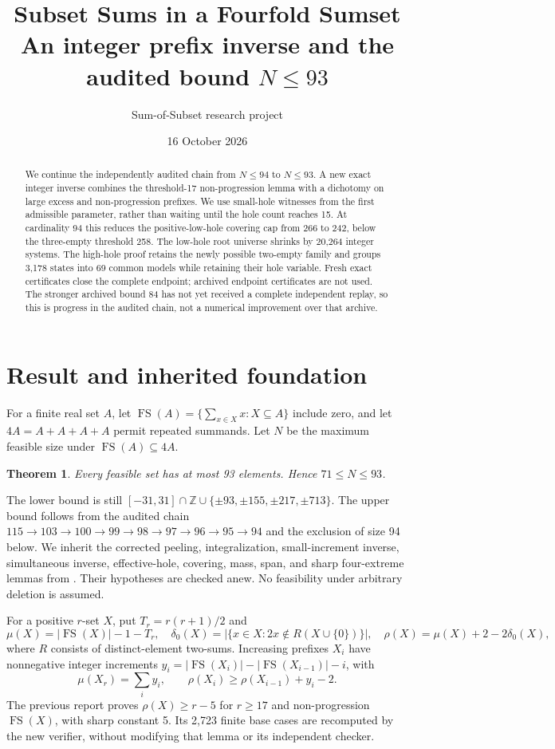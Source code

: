 \documentclass[11pt,a4paper]{article}
\title{Subset Sums in a Fourfold Sumset\\\large An integer prefix inverse and the audited bound $N\le93$}
\author{Sum-of-Subset research project}
\date{16 October 2026}
\newcommand{\FS}{\operatorname{FS}}
\newcommand{\Z}{\mathbb Z}
\newtheorem{theorem}{Theorem}[section]
\begin{document}
\maketitle
\begin{abstract}
We continue the independently audited chain from $N\le94$ to $N\le93$.
A new exact integer inverse combines the threshold-17 non-progression
lemma with a dichotomy on large excess and non-progression prefixes.
We use small-hole witnesses from the first admissible parameter, rather
than waiting until the hole count reaches 15. At cardinality 94 this
reduces the positive-low-hole covering cap from 266 to 242, below the
three-empty threshold 258. The low-hole root universe shrinks by 20,264
integer systems. The high-hole proof retains the newly possible two-empty
family and groups 3,178 states into 69 common models while retaining their hole variable.
Fresh exact certificates close the complete endpoint; archived endpoint
certificates are not used. The stronger archived bound 84 has not yet
received a complete independent replay, so this is progress in the
audited chain, not a numerical improvement over that archive.
\end{abstract}

\section{Result and inherited foundation}
For a finite real set $A$, let
$\FS(A)=\{\sum_{x\in X}x:X\subseteq A\}$ include zero, and let
$4A=A+A+A+A$ permit repeated summands. Let $N$ be the maximum feasible
size under $\FS(A)\subseteq4A$.
\begin{theorem}\label{main}
Every feasible set has at most 93 elements. Hence $71\le N\le93$.
\end{theorem}
The lower bound is still
$[-31,31]\cap\Z\cup\{\pm93,\pm155,\pm217,\pm713\}$.
The upper bound follows from the audited chain
$115\to103\to100\to99\to98\to97\to96\to95\to94$ and the exclusion of
size 94 below. We inherit the corrected peeling, integralization,
small-increment inverse, simultaneous inverse, effective-hole, covering,
mass, span, and sharp four-extreme lemmas from
\cite{foundation,overlap,previous}. Their hypotheses are checked anew.
No feasibility under arbitrary deletion is assumed.

For a positive $r$-set $X$, put $T_r=r(r+1)/2$ and
\[
 \mu(X)=|\FS(X)|-1-T_r,\quad
 \delta_0(X)=|\{x\in X:2x\notin R(X\cup\{0\})\}|,\quad
 \rho(X)=\mu(X)+2-2\delta_0(X),
\]
where $R$ consists of distinct-element two-sums. Increasing prefixes
$X_i$ have nonnegative integer increments
$y_i=|\FS(X_i)|-|\FS(X_{i-1})|-i$, with
\begin{equation}\label{rec}
 \mu(X_r)=\sum_i y_i,\qquad
 \rho(X_i)\ge\rho(X_{i-1})+y_i-2.
\end{equation}
The previous report proves $\rho(X)\ge r-5$ for $r\ge17$ and
non-progression $\FS(X)$, with sharp constant 5. Its 2,723 finite
base cases are recomputed by the new verifier, without modifying that
lemma or its independent checker.
\end{document}
